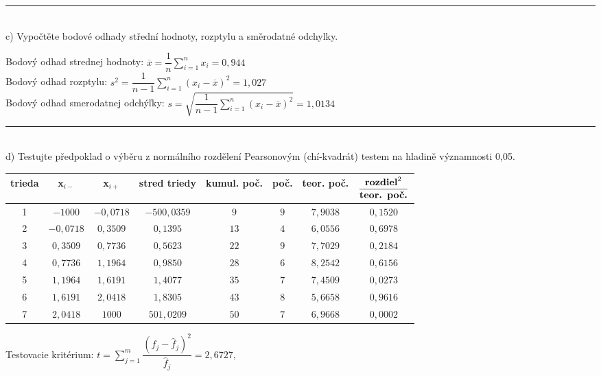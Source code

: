 \documentclass[pdftex, 11pt, a4paper, titlepage]{article}
\begin{document}
    \noindent\rule{\linewidth}{0.4pt}\\

    \noindent
    c) Vypočtěte bodové odhady střední hodnoty, rozptylu a směrodatné odchylky.

    \noindent
    Bodový odhad strednej hodnoty: $ \overline{x} = \dfrac{1}{n} \sum\limits_{i=1}^{n} x_i = 0,944 $ \\
    \noindent
    Bodový odhad rozptylu: $ s^2 = \dfrac{1}{n-1} \sum\limits_{i=1}^{n} (x_i - \overline{x})^2 = 1,027 $ \\
    \noindent
    Bodový odhad smerodatnej odchýľky: $ s = \sqrt{\dfrac{1}{n-1} \sum\limits_{i=1}^{n} (x_i - \overline{x})^2} = 1,0134 $ \\
    
    \noindent\rule{\linewidth}{0.4pt}\\

    \noindent
    d) Testujte předpoklad o výběru z normálního rozdělení Pearsonovým
    (chí-kvadrát) testem na hladině významnosti 0,05.\\

    \begin{tabular}[]{|c|c|c|c|c|c|c|c|}
        \hline
        \textbf{trieda} & \textbf{x$_{i-}$} & \textbf{x$_{i+}$} & \textbf{stred triedy} & \textbf{kumul. poč.} & \textbf{poč.} & \textbf{teor. poč.} & $\dfrac{\text{\textbf{rozdiel}}^2}{\text{\textbf{teor. poč.}}}$ \\
        \hline
        1   &   $-1000$     & $-0,0718$ & $-500,0359$   & $9$   & $9$ & $7,9038$ & $0,1520$ \\
        2   &   $-0,0718$   & $0,3509$  & $0,1395$      & $13$  & $4$ & $6,0556$ & $0,6978$ \\
        3   &   $0,3509$    & $0,7736$  & $0,5623$      & $22$  & $9$ & $7,7029$ & $0,2184$ \\
        4   &   $0,7736$    & $1,1964$  & $0,9850$      & $28$  & $6$ & $8,2542$ & $0,6156$ \\
        5   &   $1,1964$    & $1,6191$  & $1,4077$      & $35$  & $7$ & $7,4509$ & $0,0273$ \\
        6   &   $1,6191$    & $2,0418$  & $1,8305$      & $43$  & $8$ & $5,6658$ & $0,9616$ \\
        7   &   $2,0418$    & $1000$    & $501,0209$    & $50$  & $7$ & $6,9668$ & $0,0002$ \\
        \hline
    \end{tabular}

    \noindent
    Testovacie kritérium: $ t= \sum\limits_{j=1}^{m} \dfrac{(f_j - \hat{f}_j)^2}{\hat{f}_j} = 2,6727$,\\
\end{document}

